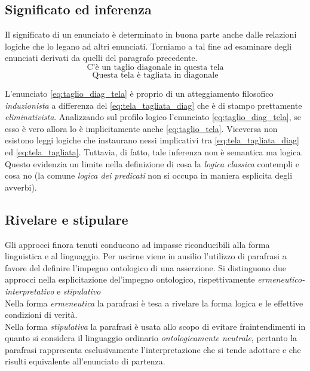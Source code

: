 \documentclass[a4paper,12pt]{article}
\begin{document}
\subsection{Significato ed inferenza} %
Il significato di un enunciato è determinato in buona parte anche dalle relazioni logiche che lo legano ad altri
enunciati. Torniamo a tal fine ad esaminare degli enunciati derivati da quelli del paragrafo precedente.
\begin{equation}
    \mbox{C'è un taglio diagonale in questa tela}
    \label{eq:taglio_diag_tela}
\end{equation}
\begin{equation}
    \mbox{Questa tela è tagliata in diagonale}
    \label{eq:tela_tagliata_diag}
\end{equation}

L'enunciato \eqref{eq:taglio_diag_tela} è proprio di un atteggiamento filosofico \textit{induzionista} a differenza
del \eqref{eq:tela_tagliata_diag} che è di stampo prettamente \textit{eliminativista}. Analizzando sul profilo logico
 l'enunciato \eqref{eq:taglio_diag_tela}, se esso è vero allora lo è implicitamente anche \eqref{eq:taglio_tela}. Viceversa 
non esistono leggi logiche che instaurano nessi implicativi tra \eqref{eq:tela_tagliata_diag} ed \eqref{eq:tela_tagliata}.
Tuttavia, di fatto, tale inferenza non è semantica ma logica.
\\ Questo evidenzia un limite nella definizione di cosa la \textit{logica classica} contempli e cosa no (la comune 
\textit{logica dei predicati} non si occupa in maniera esplicita degli avverbi).

\subsection{Rivelare e stipulare} %
Gli approcci finora tenuti conducono ad impasse riconducibili alla forma linguistica e al linguaggio. 
Per uscirne viene in ausilio l'utilizzo di parafrasi a favore del definire l'impegno ontologico di una asserzione.
Si distinguono due approcci nella esplicitazione del'impegno ontologico, rispettivamente \textit{ermeneutico-interpretativo}
e \textit{stipulativo}
\\ Nella forma \textit{ermeneutica} la parafrasi è tesa a rivelare la forma logica e le effettive condizioni di verità.
\\ Nella forma \textit{stipulativa} la parafrasi è usata allo scopo di evitare fraintendimenti in quanto si considera
il linguaggio ordinario \textit{ontologicamente neutrale}, pertanto la parafrasi rappresenta esclusivamente l'interpretazione
che si tende adottare e che risulti equivalente all'enunciato di partenza.
\end{document}
